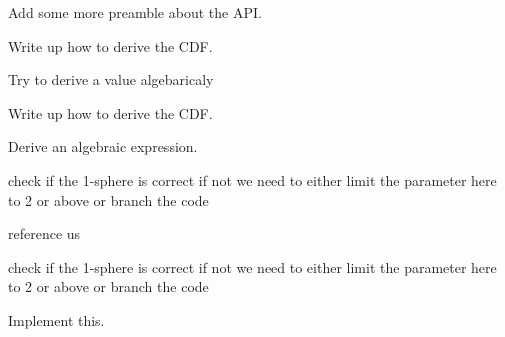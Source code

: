 
\begin{DoxyRefList}
\item[\label{todo__todo000012}%
\hypertarget{todo__todo000012}{}%
Group \hyperlink{group__api}{api} ]Add some more preamble about the A\-P\-I.


\item[\label{todo__todo000001}%
\hypertarget{todo__todo000001}{}%
Global \hyperlink{_cube_8h_aa32dd25cda8601c7f6af2dbd096dc58c}{Cube\-Distance\-C\-D\-F} (double a, double $\ast$b)]Write up how to derive the C\-D\-F.  
\item[\label{todo__todo000002}%
\hypertarget{todo__todo000002}{}%
Global \hyperlink{_cube_8h_ac37d5ff3c99d8637fc414212ac041f18}{Cube\-Distance\-Var} (double $\ast$parameters)]Try to derive a value algebaricaly  
\item[\label{todo__todo000003}%
\hypertarget{todo__todo000003}{}%
Global \hyperlink{_disk_8h_a8958adae00c0c55d68c1e81deb51c06b}{Disk\-Distance\-C\-D\-F} (double a, double $\ast$b)]Write up how to derive the C\-D\-F.  
\item[\label{todo__todo000004}%
\hypertarget{todo__todo000004}{}%
Global \hyperlink{_disk_8h_a156ab336770f189207572a9282158392}{Disk\-Distance\-Var} (double $\ast$parameters)]Derive an algebraic expression.  
\item[\label{todo__todo000007}%
\hypertarget{todo__todo000007}{}%
Global \hyperlink{_hyper_sphere_8h_a1fd054315809f3be16b79fc198a2a9b8}{Hyper\-Sphere\-Distance\-Check\-Parameters} (double $\ast$parameters, int $\ast$result, char $\ast$error\-\_\-str)]check if the 1-\/sphere is correct if not we need to either limit the parameter here to 2 or above or branch the code  
\item[\label{todo__todo000005}%
\hypertarget{todo__todo000005}{}%
Global \hyperlink{_hyper_sphere_8h_ac9f09ad018eaa239847e438a60d75aa3}{Hyper\-Sphere\-Distance\-P\-D\-F} (double t, double $\ast$parameters)]reference us  
\item[\label{todo__todo000010}%
\hypertarget{todo__todo000010}{}%
Global \hyperlink{_hyper_sphere_geodesic_8h_a0d1f54ac3a880c1c99d1ca5e85bd8256}{Hyper\-Sphere\-Geodesic\-Distance\-Check\-Parameters} (double $\ast$parameters, int $\ast$result, char $\ast$error\-\_\-str)]check if the 1-\/sphere is correct if not we need to either limit the parameter here to 2 or above or branch the code  
\item[\label{todo__todo000011}%
\hypertarget{todo__todo000011}{}%
Global \hyperlink{_hyper_sphere_geodesic_8h_a0fbca3fad98c691523aeb34eaab97d01}{Hyper\-Sphere\-Geodesic\-Distance\-Metric} (int Ncoords, double $\ast$point1, double $\ast$point2, double $\ast$parameters)]Implement this.  

\end{DoxyRefList}
